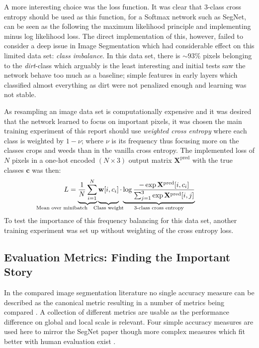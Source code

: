 \documentclass{article}
\begin{document}
A more interesting choice was the loss function. It was clear that 3-class cross entropy should be used as this function, for a Softmax network such as SegNet, can be seen as the following the maximum likelihood principle and implementing minus log likelihood loss. The direct implementation of this, however, failed to consider a deep issue in Image Segmentation which had considerable effect on this limited data set: \textit{class imbalance}. 
In this data set, there is \(\sim 93 \%\) pixels belonging to the \textit{dirt}-class which arguably is the least interesting and initial tests saw the network behave too much as a baseline; simple features in early layers which classified almost everything as dirt were not penalized enough and learning was not stable. 

As resampling an image data set is computationally expensive and it was desired that the network learned to focus on important pixels, it was chosen the main training experiment of this report should use \textit{weighted cross entropy} where each class is weighted by \(1-\nu\); where \(\nu\) is its frequency thus focusing more on the classes crops and weeds than in the vanilla cross entropy. The implemented loss of \(N\) pixels in a one-hot encoded \((N \times  3)\) output matrix \(\mathbf X^\text{pred}\) with the true classes \(\mathbf c\) was then:
\[
L = \underbrace{
	\vphantom{\sum_{i}}
	\frac 1 N
	\sum_{\mathclap {i=1}}^{N}
}
_{\mathllap{\text{Mean over minibatch}}}
\underbrace{ 
	\vphantom{\sum_{i}}
	\mathbf{w}[i, c_i]}
_{\mathclap{\text{Class weight}}}  
\cdot 
\underbrace{
	\log 
	\frac
	{-\exp\mathbf X^\text{pred}[i, c_i]}
	{\sum_{j=1}^{3}\exp\mathbf X^\text{pred}[i, j]}
}_{\mathclap{\text{3-class cross entropy}}}
\] 
To test the importance of this frequency balancing for this data set, another training experiment was set up without weighting of the cross entropy loss.
\subsection{Evaluation Metrics: Finding the Important Story}
In the compared image segmentation literature no single accuracy measure can be described  as the canonical metric resulting in a number of metrics being compared \cite{eval, Metric}.  A collection of different metrics are usable as the performance difference on global and local scale is relevant. 
Four simple accuracy measures are used here to mirror the SegNet paper \cite{seg} though more complex measures which fit better with human evaluation exist \cite{eval}. 
\end{document}
